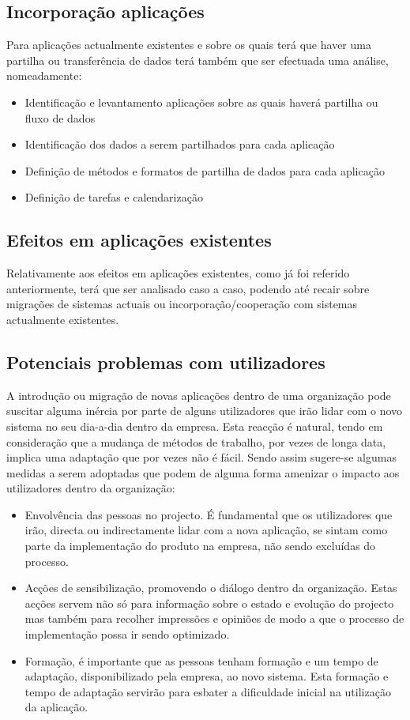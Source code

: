 \subsection{Incorporação aplicações}
Para aplicações actualmente existentes e sobre os quais terá que haver uma partilha ou transferência de dados terá também que ser efectuada uma análise, nomeadamente:

\begin{itemize} 
\item Identificação e levantamento aplicações sobre as quais haverá partilha ou fluxo de dados
\item Identificação dos dados a serem partilhados para cada aplicação
\item Definição de métodos e formatos de partilha de dados para cada aplicação
\item Definição de tarefas e calendarização  
\end{itemize} 

\subsection{Efeitos em aplicações existentes}
 Relativamente aos efeitos em aplicações existentes, como já foi referido anteriormente, terá que ser analisado caso a caso, podendo até recair sobre migrações de sistemas actuais ou incorporação/cooperação com sistemas actualmente existentes.

\subsection{Potenciais problemas com utilizadores}
A introdução ou migração de novas aplicações dentro de uma organização pode suscitar alguma inércia por parte de alguns utilizadores que irão lidar com o novo sistema no seu dia-a-dia dentro da empresa. Esta reacção é natural, tendo em consideração que a mudança de métodos de trabalho, por vezes de longa data, implica uma adaptação que por vezes não é fácil.
Sendo assim sugere-se algumas medidas a serem adoptadas que podem de alguma forma amenizar o impacto aos utilizadores dentro da organização:

\begin{itemize} 
\item Envolvência das pessoas no projecto. É fundamental que os utilizadores que irão, directa ou indirectamente lidar com a nova aplicação, se sintam como parte da implementação do produto na empresa, não sendo excluídas do processo.
\item Acções de sensibilização, promovendo o diálogo dentro da organização. Estas acções servem não só para informação sobre o estado e evolução do projecto mas também para recolher impressões e opiniões de modo a que o processo de implementação possa ir sendo optimizado.
\item Formação, é importante que as pessoas tenham formação e um tempo de adaptação, disponibilizado pela empresa, ao novo sistema. Esta formação e tempo de adaptação servirão para esbater a dificuldade inicial na utilização da aplicação.
\end{itemize} 

